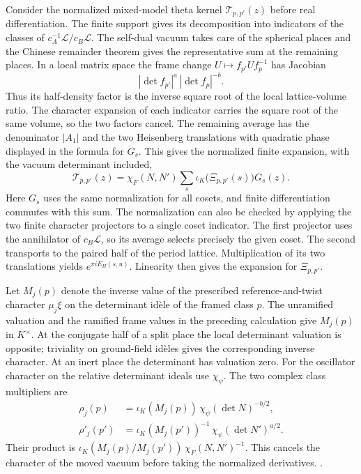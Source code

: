 Consider the normalized mixed-model theta kernel
\(\mathcal T_{p,p'}(z)\) before real differentiation.
The finite support gives its decomposition into
indicators of the classes of \(c_A^{-1}\mathcal L/c_B\mathcal L\).
The self-dual vacuum takes care of the spherical places
and the Chinese remainder theorem gives the representative
sum at the remaining places. In a local matrix space the
frame change \(U\mapsto f_{p'}U f_p^{-1}\) has Jacobian
\[
 |\det f_{p'}|^a\,|\det f_p|^{-b}.
\]
Thus its half-density factor is the inverse square root
of the local lattice-volume ratio. The character
expansion of each indicator carries the square root of
the same volume, so the two factors cancel. The remaining
average has the denominator \(|A_1|\) and the two
Heisenberg translations with quadratic phase displayed
in the formula for \(G_s\). This gives the normalized
finite expansion, with the vacuum determinant included,
\[
  \mathcal T_{p,p'}(z)
      =\chi_F(N,N')\sum_s
            \iota_K\bigl(\Xi_{p,p'}(s)\bigr)G_s(z).
\]
Here \(G_s\) uses the same normalization for all cosets,
and finite differentiation commutes with this sum. The
normalization can also be checked by applying the two
finite character projectors to a single coset indicator.
The first projector uses the annihilator of
\(c_B\mathcal L\), so its average selects precisely the
given coset. The second transports to the paired half
of the period lattice. Multiplication of its two
translations yields \(e^{\pi i E_H(s,u)}\). Linearity
then gives the expansion for \(\Xi_{p,p'}\).

Let \(M_j(p)\) denote the inverse value of the
prescribed reference-and-twist character \(\mu_j\xi\)
on the determinant id\`ele of the framed class \(p\).
The unramified valuation and the ramified frame values
in the preceding calculation give \(M_j(p)\) in \(K^\times\).
At the conjugate half of a split place the local
determinant valuation is opposite; triviality on
ground-field id\`eles gives the corresponding inverse
character. At an inert place the determinant has
valuation zero. For the oscillator character on the
relative determinant ideals use \(\chi_\psi\). The two
complex class multipliers are
\[
 \begin{aligned}
 \rho_j(p)
   &=\iota_K(M_j(p))\,
           \chi_\psi(\det N)^{-b/2},\\
 \rho'_j(p')
   &=\iota_K(M_j(p'))^{-1}\,
           \chi_\psi(\det N')^{a/2}.
 \end{aligned}
\]
Their product is \(\iota_K(M_j(p)/M_j(p'))\,
\chi_F(N,N')^{-1}\). This cancels the character of the
moved vacuum before taking the normalized derivatives.
.


